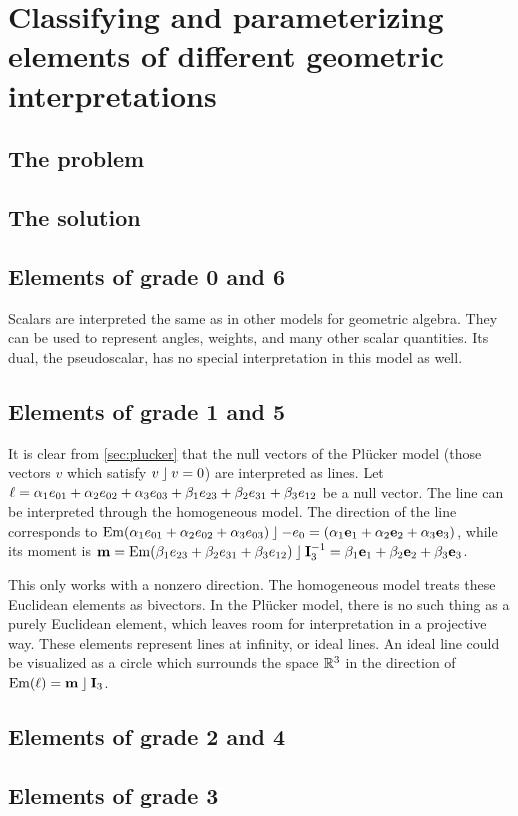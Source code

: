 \section{Classifying and parameterizing elements of different geometric interpretations}
\label{ch:research}


\subsection{The problem}
\label{sec:problem}

\subsection{The solution}
\label{sec:solution}

\subsection{Elements of grade 0 and 6}
Scalars are interpreted the same as in other models for geometric algebra.  They can be used to represent angles, weights, and many other scalar quantities.  Its dual, the pseudoscalar, has no special interpretation in this model as well.


\subsection{Elements of grade 1 and 5}
It is clear from \autoref{sec:plucker} that the null vectors of the Pl\"ucker model (those vectors $v$ which satisfy $v \mathbin{\rfloor} v = 0$) are interpreted as lines.  Let $\ell = \alpha_1 e_{01} + \alpha_2 e_{02} + \alpha_3 e_{03} + \beta_1 e_{23} + \beta_2 e_{31} + \beta_3 e_{12}$ be a null vector.  The line can be interpreted through the homogeneous model.  The direction of the line corresponds to $\operatorname{Em}(\alpha_1 e_{01} + \alpha_2 e_{02} + \alpha_3 e_{03}) \mathbin{\rfloor} -e_0 = (\alpha_1 \mathbf{e}_1 + \alpha_2 \mathbf{e}_2 + \alpha_3 \mathbf{e}_3)$, while its moment is $\mathbf{m} = \operatorname{Em}(\beta_1 e_{23} + \beta_2 e_{31} + \beta_3 e_{12}) \mathbin{\rfloor} \mathbf{I}_3^{-1} = \beta_1 \mathbf{e}_1 + \beta_2 \mathbf{e}_2 + \beta_3 \mathbf{e}_3$.

This only works with a nonzero direction.  The homogeneous model treats these Euclidean elements as bivectors.  In the Pl\"ucker model, there is no such thing as a purely Euclidean element, which leaves room for interpretation in a projective way.  These elements represent lines at infinity, or ideal lines.  An ideal line could be visualized as a circle which surrounds the space $\mathbb{R}^3$ in the direction of $\operatorname{Em}(\ell) = \mathbf{m} \mathbin{\rfloor} \mathbf{I}_3$.



\subsection{Elements of grade 2 and 4}

\subsection{Elements of grade 3}
